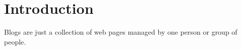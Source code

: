 \section{Introduction}

Blogs are just a collection of web pages managed by one person or group of people. 